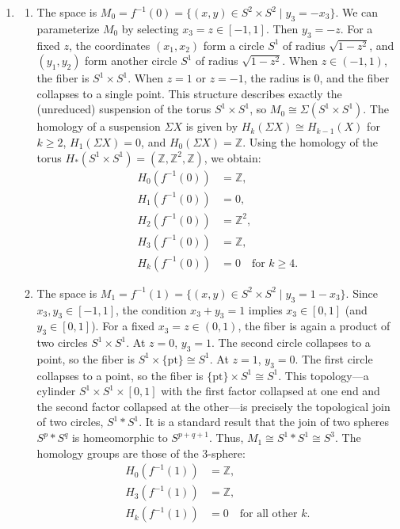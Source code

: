\documentclass{article}
\begin{document}
\begin{enumerate}[label=\fbox{\arabic*}]
  \item %
        \begin{enumerate}[label=(\arabic*)]
          \item The space is $M_0 = f^{-1}(0) = \{ (x, y) \in S^2 \times S^2 \mid y_3 = -x_3 \}$.
          We can parameterize $M_0$ by selecting $x_3 = z \in [-1, 1]$. Then $y_3 = -z$.
          For a fixed $z$, the coordinates $(x_1, x_2)$ form a circle $S^1$ of radius $\sqrt{1-z^2}$, and $(y_1, y_2)$ form another circle $S^1$ of radius $\sqrt{1-z^2}$.
          When $z \in (-1, 1)$, the fiber is $S^1 \times S^1$.
          When $z = 1$ or $z = -1$, the radius is $0$, and the fiber collapses to a single point.
          This structure describes exactly the (unreduced) suspension of the torus $S^1 \times S^1$, so $M_0 \cong \Sigma(S^1 \times S^1)$.
          The homology of a suspension $\Sigma X$ is given by $H_k(\Sigma X) \cong H_{k-1}(X)$ for $k \ge 2$, $H_1(\Sigma X) = 0$, and $H_0(\Sigma X) = \mathbb{Z}$.
          Using the homology of the torus $H_*(S^1 \times S^1) = (\mathbb{Z}, \mathbb{Z}^2, \mathbb{Z})$, we obtain:
          \begin{align*}
            H_0(f^{-1}(0)) &= \mathbb{Z}, \\
            H_1(f^{-1}(0)) &= 0, \\
            H_2(f^{-1}(0)) &= \mathbb{Z}^2, \\
            H_3(f^{-1}(0)) &= \mathbb{Z}, \\
            H_k(f^{-1}(0)) &= 0 \quad \text{for } k \ge 4.
          \end{align*}

          \item The space is $M_1 = f^{-1}(1) = \{ (x, y) \in S^2 \times S^2 \mid y_3 = 1 - x_3 \}$.
          Since $x_3, y_3 \in [-1, 1]$, the condition $x_3 + y_3 = 1$ implies $x_3 \in [0, 1]$ (and $y_3 \in [0, 1]$).
          For a fixed $x_3 = z \in (0, 1)$, the fiber is again a product of two circles $S^1 \times S^1$.
          At $z = 0$, $y_3 = 1$. The second circle collapses to a point, so the fiber is $S^1 \times \{\text{pt}\} \cong S^1$.
          At $z = 1$, $y_3 = 0$. The first circle collapses to a point, so the fiber is $\{\text{pt}\} \times S^1 \cong S^1$.
          This topology—a cylinder $S^1 \times S^1 \times [0,1]$ with the first factor collapsed at one end and the second factor collapsed at the other—is precisely the topological join of two circles, $S^1 * S^1$.
          It is a standard result that the join of two spheres $S^p * S^q$ is homeomorphic to $S^{p+q+1}$.
          Thus, $M_1 \cong S^1 * S^1 \cong S^3$.
          The homology groups are those of the 3-sphere:
          \begin{align*}
            H_0(f^{-1}(1)) &= \mathbb{Z}, \\
            H_3(f^{-1}(1)) &= \mathbb{Z}, \\
            H_k(f^{-1}(1)) &= 0 \quad \text{for all other } k.
          \end{align*}
        \end{enumerate}


\end{enumerate}
\end{document}
